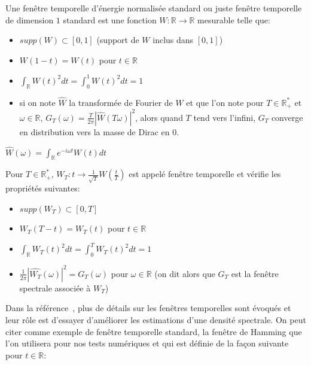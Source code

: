 \begin{definition}
  Une fenêtre temporelle d'énergie normalisée standard ou juste fenêtre temporelle de dimension $1$ standard est une fonction $W: \mathbb{R} \rightarrow \mathbb{R}$ mesurable telle que:
\begin{itemize}
\item $supp(W) \subset [0,1]$ (support de $W$ inclus dans $[0,1]$)
\item $W(1-t) = W(t)$ pour $t \in \mathbb{R}$
\item $\displaystyle\int_{\mathbb{R}} W(t)^2 dt = \displaystyle\int_{0}^{1} W(t)^2 dt = 1$
\item si on note $\hat{W}$ la transformée de Fourier de $W$
et que l'on note pour $T \in \mathbb{R}^{*}_{+}$ et $\omega \in \mathbb{R}$, $G_{T}(\omega) = \frac{T}{2\pi} |\hat{W}(T\omega)|^{2}$, alors
quand $T$ tend vers l'infini, $G_T$ converge en distribution vers la masse de Dirac en $0$.
\end{itemize}
\end{definition}

\begin{remark}
  $\hat{W}(\omega) = \displaystyle\int_{\mathbb{R}} e^{-i\omega t} W(t) dt $
\end{remark}
\begin{remark}
  Pour $T \in \mathbb{R}^{*}_{+}$, $W_{T}: t \rightarrow \frac{1}{\sqrt{T}} W(\frac{t}{T}) $ est appelé fenêtre temporelle et
  vérifie les propriétés suivantes:
  \begin{itemize}
   \item $supp(W_T) \subset [0,T]$ 
   \item $W_T(T-t) = W_{T}(t)$ pour $t \in \mathbb{R}$
   \item $\displaystyle\int_{\mathbb{R}} W_T(t)^2 dt = \displaystyle\int_{0}^{T} W_T(t)^2 dt = 1$
   \item $\frac{1}{2\pi} |\hat{W_T}(\omega)|^{2} = G_{T}(\omega)$ pour $\omega \in \mathbb{R}$
     (on dit alors que $G_{T}$ est la fenêtre spectrale associée à $W_{T}$)
\end{itemize}
\end{remark}

\noindent Dans la référence~\cite{alma991000210539806616}, plus de détails sur les fenêtres temporelles sont évoqués
et leur rôle est d'essayer d'améliorer les estimations d'une densité spectrale. On peut citer comme exemple de
fenêtre temporelle standard, la fenêtre de Hamming que l'on utilisera pour nos tests numériques et qui est
définie de la façon suivante pour $t \in \mathbb{R}$:

